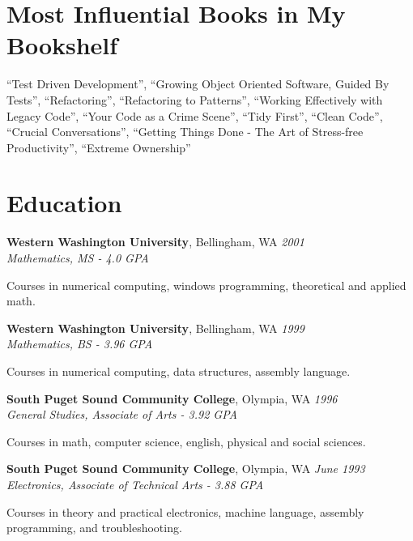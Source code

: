 \documentclass[letter,11pt]{article}
\newenvironment{noindentblock}{%
  \begin{list}{}{%
    \setlength{\leftmargin}{0in} %
    \setlength{\rightmargin}{.25in} %
    \setlength{\topsep}{0pt} %
    \setlength{\parsep}{0pt} %
  }
  \item[]}{\end{list}}
\begin{document}
\section*{Most Influential Books in My  Bookshelf}
``Test Driven Development'', ``Growing Object Oriented Software, Guided By Tests'', ``Refactoring'', ``Refactoring to Patterns'', ``Working Effectively with Legacy Code'', ``Your Code as a Crime Scene'', ``Tidy First'', ``Clean Code'', ``Crucial Conversations'', ``Getting Things Done - The Art of Stress-free Productivity'', ``Extreme Ownership''

\section*{Education}

\noindent
\textbf{Western Washington University}, Bellingham, WA \hfill \textit{2001}\\
\textit{Mathematics, MS - 4.0 GPA} 
\begin{noindentblock}
Courses in numerical computing, windows programming, theoretical and applied math.
\end{noindentblock}

\noindent
\textbf{Western Washington University}, Bellingham, WA \hfill \textit{1999}\\
\textit{Mathematics, BS - 3.96 GPA}
\begin{noindentblock}
Courses in numerical computing, data structures, assembly language.
\end{noindentblock}

\noindent
\textbf{South Puget Sound Community College}, Olympia, WA \hfill \textit{1996}\\
\textit{General Studies, Associate of Arts - 3.92 GPA}
\begin{noindentblock}
Courses in math, computer science, english, physical and social sciences.
\end{noindentblock}

\noindent
\textbf{South Puget Sound Community College}, Olympia, WA \hfill \textit{June 1993}\\
\textit{Electronics, Associate of Technical Arts - 3.88 GPA}
\begin{noindentblock}
Courses in theory and practical electronics, machine language, assembly programming, and troubleshooting.
\end{noindentblock}

\end{document}

